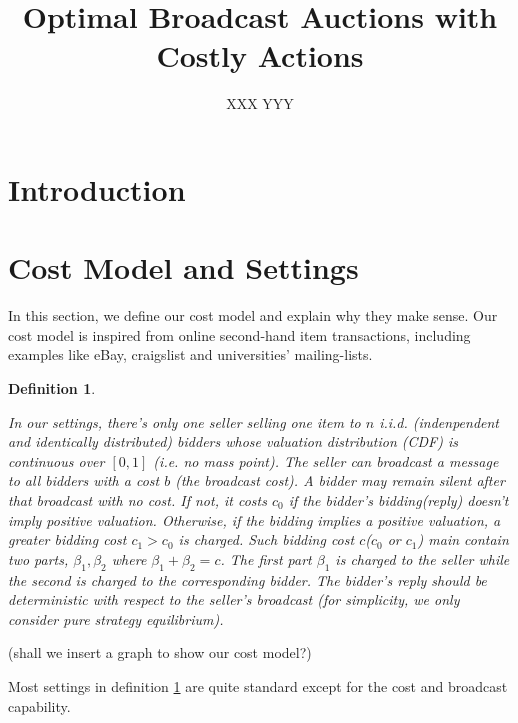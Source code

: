 \documentclass{aamas2012}
\newtheorem{definition}{Definition}
\begin{document}
\title{Optimal Broadcast Auctions with Costly Actions}


\author{ \alignauthor XXX \alignauthor YYY }


\maketitle

\section{Introduction}

\section{Cost Model and Settings}

In this section, we define our cost model and explain why they make sense. Our
cost model is inspired from online second-hand item transactions, including
examples like eBay, craigslist and universities' mailing-lists.


\begin{definition}\label{def:model}

In our settings, there's only one seller selling one item to $n$ i.i.d.
(indenpendent and identically distributed) bidders whose valuation distribution
(CDF) is continuous over $[0, 1]$ (i.e. no mass point).  The seller can
broadcast a message to all bidders with a cost $b$ (the broadcast cost). A
bidder may remain silent after that broadcast with no cost.  If not, it costs
$c_0$ if the bidder's bidding(reply) doesn't imply positive valuation.
Otherwise, if the bidding implies a positive valuation, a greater bidding cost
$c_1 > c_0$ is charged.  Such bidding cost $c$($c_0$ or $c_1$) main contain two
parts, $\beta_1, \beta_2$ where $\beta_1+\beta_2 = c$.  The first part
$\beta_1$ is charged to the seller while the second is charged to the
corresponding bidder. The bidder's reply should be deterministic with respect
to the seller's broadcast (for simplicity, we only consider pure strategy
equilibrium).

\end{definition}

(shall we insert a graph to show our cost model?)

Most settings in definition \ref{def:model} are quite standard except for the
cost and broadcast capability.
\end{document}
